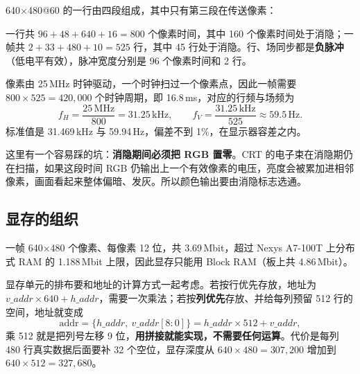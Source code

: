 \documentclass[12pt, a4paper]{ctexart}
\begin{document}
640$\times$480@60 的一行由四段组成，其中只有第三段在传送像素：

\begin{center}
\end{center}

\noindent 一行共 $96+48+640+16=800$ 个像素时间，其中 160 个像素时间处于消隐；一帧共 $2+33+480+10=525$ 行，其中 45 行处于消隐。行、场同步都是\textbf{负脉冲}（低电平有效），脉冲宽度分别是 96 个像素时间和 2 行。

像素由 25\,MHz 时钟驱动，一个时钟扫过一个像素点，因此一帧需要 $800\times525=420{,}000$ 个时钟周期，即 16.8\,ms，对应的行频与场频为
\[
f_H=\frac{25\,\text{MHz}}{800}=31.25\,\text{kHz},\qquad
f_V=\frac{31.25\,\text{kHz}}{525}\approx 59.5\,\text{Hz}.
\]
标准值是 31.469\,kHz 与 59.94\,Hz，偏差不到 1\%，在显示器容差之内。

这里有一个容易踩的坑：\textbf{消隐期间必须把 RGB 置零}。CRT 的电子束在消隐期仍在扫描，如果这段时间 RGB 仍输出上一个有效像素的电压，亮度会被累加进相邻像素，画面看起来整体偏暗、发灰。所以颜色输出要由消隐标志选通。

\subsection{显存的组织}
一帧 640$\times$480 个像素、每像素 12 位，共 3.69\,Mbit，超过 Nexys A7-100T 上分布式 RAM 的 1.188\,Mbit 上限，因此显存只能用 Block RAM（板上共 4.86\,Mbit）。

显存单元的排布要和地址的计算方式一起考虑。若按行优先存放，地址为 $v\_addr\times640+h\_addr$，需要一次乘法；若按\textbf{列优先}存放、并给每列预留 512 行的空间，地址就变成
\[
\text{addr}=\{h\_addr,\ v\_addr[8{:}0]\}=h\_addr\times512+v\_addr,
\]
乘 512 就是把列号左移 9 位，\textbf{用拼接就能实现，不需要任何运算}。代价是每列 480 行真实数据后面要补 32 个空位，显存深度从 $640\times480=307{,}200$ 增加到 $640\times512=327{,}680$。
\end{document}
